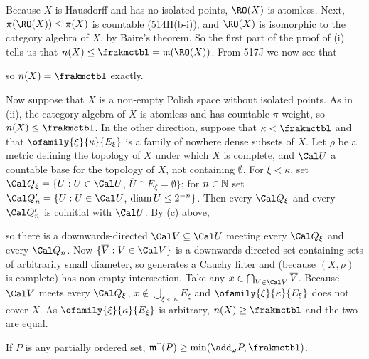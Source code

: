 {\medskip

 Because $X$ is Hausdorff and has no isolated points,
$\RO(X)$ is atomless.   Next, $\pi(\RO(X))\le\pi(X)$ is countable
(514H(b-i)), and $\RO(X)$ is isomorphic to the category algebra of $X$, by
Baire's theorem.   So the first part of the proof of (i) tells us that
$n(X)\le\frakmctbl=\frak m(\RO(X))$.   From 517J we now see that


\noindent so $n(X)=\frakmctbl$ exactly.

\medskip

 Now suppose that $X$ is a non-empty Polish space
without isolated points.   As in (ii), the category algebra of $X$ is
atomless and has countable $\pi$-weight, so $n(X)\le\frakmctbl$.   In
the other direction, suppose that $\kappa<\frakmctbl$ and that
$\ofamily{\xi}{\kappa}{E_{\xi}}$ is a family of nowhere dense subsets of
$X$.   Let $\rho$ be a metric defining the topology of $X$ under which
$X$ is complete, and $\Cal U$ a countable base for the topology of $X$,
not containing $\emptyset$.   For $\xi<\kappa$, set
$\Cal Q_{\xi}=\{U:U\in\Cal U$, $\overline{U}\cap E_{\xi}=\emptyset\}$;
for $n\in\Bbb N$ set $\Cal Q'_n=\{U:U\in\Cal U$, $\mathop{\text{diam}} U\le 2^{-n}\}$.
Then every $\Cal Q_{\xi}$ and every $\Cal Q'_n$ is coinitial with
$\Cal U$.   By (c) above,


\noindent so there is a downwards-directed $\Cal V\subseteq\Cal U$
meeting every $\Cal Q_{\xi}$ and every $\Cal Q_n$.   Now
$\{\overline{V}:V\in\Cal V\}$ is a downwards-directed set containing
sets of arbitrarily small diameter, so generates a Cauchy filter and
(because $(X,\rho)$ is complete) has non-empty intersection.   Take any
$x\in\bigcap_{V\in\Cal V}\overline{V}$.   Because $\Cal V$ meets every
$\Cal Q_{\xi}$, $x\notin\bigcup_{\xi<\kappa}E_{\xi}$ and
$\ofamily{\xi}{\kappa}{E_{\xi}}$ does not cover $X$.  As
$\ofamily{\xi}{\kappa}{E_{\xi}}$ is arbitrary, $n(X)\ge\frakmctbl$ and
the two are equal.
}%

 If $P$ is any partially ordered set,
$\frak m^{\uparrow}(P)\ge\min(\add_{\omega}P,\frakmctbl)$.


